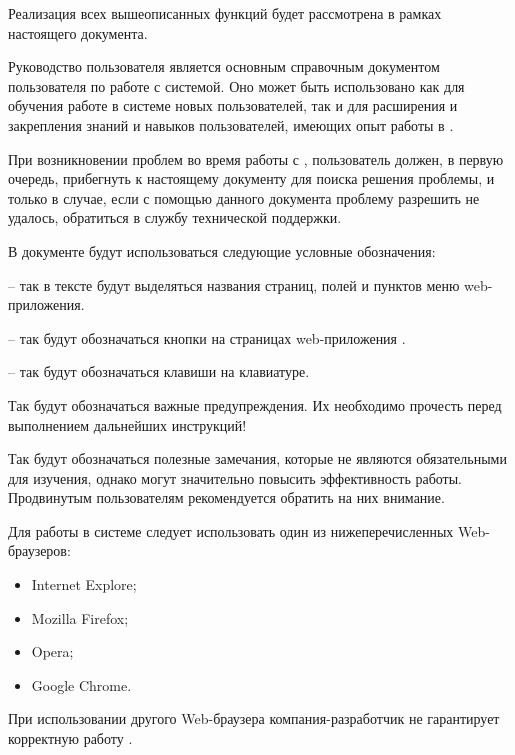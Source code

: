 Реализация всех вышеописанных функций будет рассмотрена в рамках настоящего документа.

\newpage
{}

 Руководство пользователя является основным справочным документом пользователя по работе с системой. Оно может быть использовано как для обучения работе в системе новых пользователей, так и для расширения и закрепления знаний и навыков пользователей, имеющих опыт работы в \tmis .

 При возникновении проблем во время работы с \tmis , пользователь должен, в первую очередь, прибегнуть к настоящему документу для поиска решения проблемы, и только в случае, если с помощью данного документа проблему разрешить не удалось, обратиться в службу технической поддержки.

 В документе будут использоваться следующие условные обозначения:  \vspace*{0.5em}
 
  -- так в тексте будут выделяться названия страниц, полей и пунктов меню web-приложения.
 
  -- так будут обозначаться кнопки на страницах web-приложения \tmis .
 
  -- так будут обозначаться клавиши на  клавиатуре.
 
 \begin{vnim}
  Так будут обозначаться важные предупреждения. Их необходимо прочесть перед выполнением дальнейших инструкций!
 \end{vnim}
 
 \begin{prim}
 Так будут обозначаться полезные замечания, которые не являются обязательными для изучения, однако могут значительно повысить эффективность работы. Продвинутым пользователям рекомендуется обратить на них внимание.
 \end{prim}

Для работы в системе следует использовать один из нижеперечисленных Web-браузеров:
\begin{itemize}
\item Internet Explore;
\item Mozilla Firefox;
\item Opera;
\item Google Chrome.
\end{itemize}
При использовании другого Web-браузера компания-разработчик не гарантирует корректную работу \tmis.